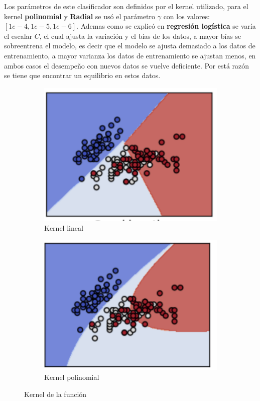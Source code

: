 Los parámetros de este clasificador son definidos por el kernel utilizado, para el kernel \textbf{polinomial} y \textbf{Radial} se usó el parámetro $\gamma$ con los valores: $[1e-4, 1e-5, 1e-6]$. Ademas como se explicó en \textbf{regresión logística} se varía el escalar $C$, el cual ajusta la variación y el bías de los datos, a mayor bías se sobreentrena el modelo, es decir que el modelo se ajusta demasiado a los datos de entrenamiento, a mayor varianza los datos de entrenamiento se ajustan menos, en ambos casos el desempeño con nuevos datos se vuelve deficiente. Por está razón se tiene que encontrar un equilibrio en estos datos.\\



\begin{figure}[H]
\centering
	\begin{subfigure}{.5\textwidth}
	\centering
	\includegraphics[scale=0.8]{imagenes/capitulo5/Entrenamiento/klineal.png}
	\caption{Kernel lineal}
	\label{fig:cp5:klineal}
	\end{subfigure}%
	\begin{subfigure}{.5\textwidth}
	\centering
	\includegraphics[scale=0.8]{imagenes/capitulo5/Entrenamiento/kpoli.png}
	\caption{Kernel polinomial}
	\label{fig:cp5:kpoli}
	\end{subfigure}%
\caption{Kernel de la función \citep{CC1}}
\end{figure}

